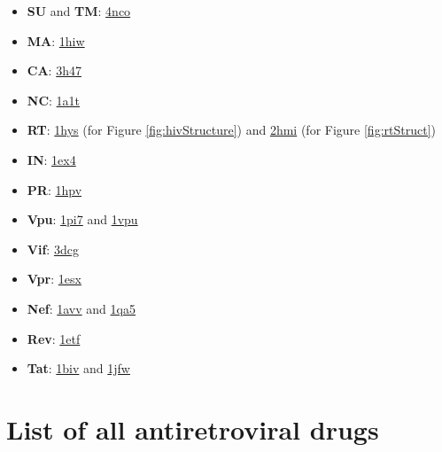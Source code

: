 \documentclass[
  11pt,
  twoside,
  BCOR=10mm,
  listof=totoc]{scrbook}
\begin{document}
\begin{itemize}
\item
  \textbf{SU} and \textbf{TM}: \href{http://www.rcsb.org/pdb/explore.do?structureId=4nco}{4nco}
\item
  \textbf{MA}: \href{http://rcsb.org/pdb/explore/explore.do?structureId=1hiw}{1hiw}
\item
  \textbf{CA}: \href{http://rcsb.org/pdb/explore/explore.do?structureId=3h47}{3h47}
\item
  \textbf{NC}: \href{http://rcsb.org/pdb/explore/explore.do?structureId=1a1t}{1a1t}
\item
  \textbf{RT}: \href{http://www.rcsb.org/pdb/explore.do?structureId=1hys}{1hys} (for Figure \ref{fig:hivStructure}) and \href{http://www.rcsb.org/pdb/explore.do?structureId=2hmi}{2hmi} (for Figure \ref{fig:rtStruct})
\item
  \textbf{IN}: \href{http://www.rcsb.org/pdb/explore.do?structureId=1ex4}{1ex4}
\item
  \textbf{PR}: \href{http://www.rcsb.org/pdb/explore.do?structureId=1hpv}{1hpv}
\item
  \textbf{Vpu}: \href{http://www.rcsb.org/pdb/explore.do?structureId=1pi7}{1pi7} and \href{http://www.rcsb.org/pdb/explore.do?structureId=1vpu}{1vpu}
\item
  \textbf{Vif}: \href{http://www.rcsb.org/pdb/explore.do?structureId=3dcg}{3dcg}
\item
  \textbf{Vpr}: \href{http://www.rcsb.org/pdb/explore.do?structureId=1esx}{1esx}
\item
  \textbf{Nef}: \href{http://www.rcsb.org/pdb/explore.do?structureId=1avv}{1avv} and \href{http://www.rcsb.org/pdb/explore.do?structureId=1qa5}{1qa5}
\item
  \textbf{Rev}: \href{http://www.rcsb.org/pdb/explore.do?structureId=1etf}{1etf}
\item
  \textbf{Tat}: \href{http://www.rcsb.org/pdb/explore.do?structureId=1biv}{1biv} and \href{http://www.rcsb.org/pdb/explore.do?structureId=1jfw}{1jfw}
\end{itemize}

\hypertarget{list-of-all-antiretroviral-drugs}{%
\section{List of all antiretroviral drugs}\label{list-of-all-antiretroviral-drugs}}
\end{document}
